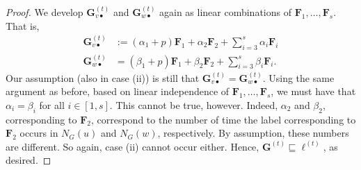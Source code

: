 \begin{proof}
We develop $\mathbf{G}^{(t)}_{v\bullet}$ and $\mathbf{G}^{(t)}_{w\bullet}$ again as linear combinations of $\mathbf{F}_1,\ldots,\mathbf{F}_s$. That is,
	\begin{align*}
	\mathbf{G}^{(t)}_{v\bullet}&:=(\alpha_1+p)\mathbf{F}_1+ \alpha_2\mathbf{F}_2+ \sum_{i=3}^s \alpha_i\mathbf{F}_i\\
	\mathbf{G}^{(t)}_{w\bullet}&=(\beta_1+p)\mathbf{F}_1+ \beta_2\mathbf{F}_2+ \sum_{i=3}^s \beta_i\mathbf{F}_i.
	\end{align*}
	Our assumption (also in case (ii)) is still that $\mathbf{G}^{(t)}_{v\bullet}=\mathbf{G}^{(t)}_{w\bullet}$. Using the same argument as before, based on linear independence of $\mathbf{F}_1,\ldots,\mathbf{F}_s$, we must have that 
	$\alpha_i=\beta_i$ for all $i\in [1,s]$.
This cannot be true, however. Indeed,
 $\alpha_2$ and $\beta_2$, corresponding to $\mathbf{F}_2$, correspond to the number of time the label corresponding to $\mathbf{F}_2$ occurs in $N_G(u)$ and $N_G(w)$, respectively. By assumption, these numbers are different. So again, case (ii) cannot occur either. Hence, $\mathbf{G}^{(t)}\sqsubseteq \pmb{\ell}^{(t)}$, as desired.
\end{proof}




